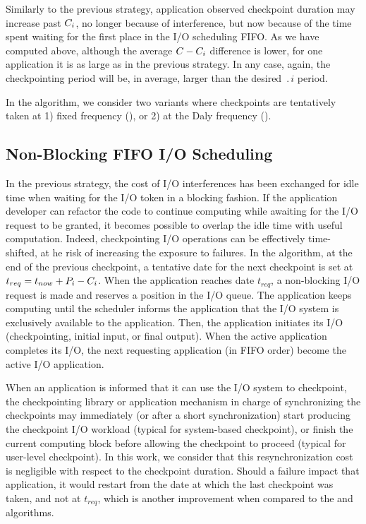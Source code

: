 Similarly to the previous strategy, application observed checkpoint
duration may increase past $C_{i}$, no longer because of interference, but now because
of  the time spent waiting for the first place in the I/O scheduling FIFO.
As we have computed above, although the average $C-C_{i}$
difference is lower, for one application it is as large as in the
previous strategy. In any case, again, the checkpointing period will
be, in average, larger than the desired $\period{i}$ period.

In the \fifoblock algorithm, we consider two variants where checkpoints are
tentatively taken at 1) fixed frequency (\bfifofixed), or 2) at the
Daly frequency (\bfifodaly).

\subsection{Non-Blocking \fifononblock FIFO I/O Scheduling}

In the previous strategy, the cost of I/O interferences has been
exchanged for idle time when waiting for the I/O token in a blocking
fashion. If the application developer can refactor the code
to continue computing while awaiting for the I/O request to be granted,
it becomes possible to overlap the idle time with useful computation.
Indeed, checkpointing I/O operations can
be effectively time-shifted, at he risk of increasing the exposure to failures.
 In the \fifononblock algorithm, at the end of the previous checkpoint, a tentative
date for the next checkpoint is set at $t_{req}=t_{now}+P_{i}-C_{i}$.
When the application reaches date $t_{req}$, a non-blocking I/O request
is made and reserves a position in the
I/O queue. The application keeps computing until the
scheduler informs the application that the I/O system is exclusively
available to the application. Then, the application initiates its
I/O (checkpointing, initial input, or final output). When the active application completes
its I/O, the next requesting application (in FIFO order)
become the active I/O application.

When an application is informed that it can use the I/O system to
checkpoint, the checkpointing library or application mechanism
in charge of synchronizing the checkpoints may immediately (or after
a short synchronization) start producing the checkpoint I/O workload
(typical for system-based checkpoint),
or finish the current computing block before allowing the checkpoint
to proceed (typical for user-level checkpoint). In this work, we consider
that this resynchronization cost is negligible with respect to the
checkpoint duration. Should a failure impact that application,
it would restart from the date at which the last checkpoint was taken, and
not at $t_{req}$, which is another improvement when compared to the
\fifoblock and \nocoop algorithms.

